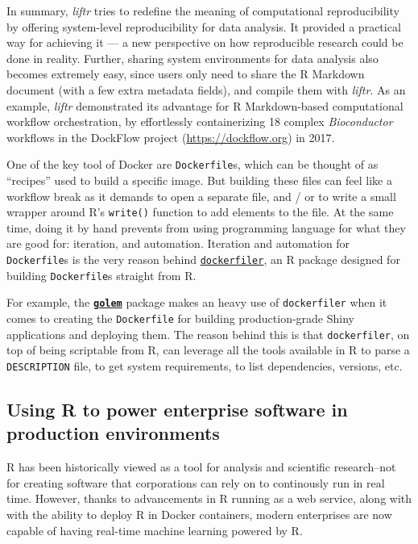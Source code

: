 In summary, \emph{liftr} tries to redefine the meaning of computational
reproducibility by offering system-level reproducibility for data
analysis. It provided a practical way for achieving it --- a new
perspective on how reproducible research could be done in reality.
Further, sharing system environments for data analysis also becomes
extremely easy, since users only need to share the R Markdown document
(with a few extra metadata fields), and compile them with \emph{liftr}.
As an example, \emph{liftr} demonstrated its advantage for R
Markdown-based computational workflow orchestration, by effortlessly
containerizing 18 complex \emph{Bioconductor} workflows in the DockFlow
project (\url{https://dockflow.org}) in 2017.

One of the key tool of Docker are \texttt{Dockerfile}s, which can be
thought of as ``recipes'' used to build a specific image. But building
these files can feel like a workflow break as it demands to open a
separate file, and / or to write a small wrapper around R's
\texttt{write()} function to add elements to the file. At the same time,
doing it by hand prevents from using programming language for what they
are good for: iteration, and automation. Iteration and automation for
\texttt{Dockerfile}s is the very reason behind
\href{https://github.com/ColinFay/dockerfiler}{\texttt{dockerfiler}}, an
R package designed for building \texttt{Dockerfile}s straight from R.

For example, the
\textbf{\href{https://github.com/ThinkR-open/golem}{\texttt{golem}}}
package makes an heavy use of \texttt{dockerfiler} when it comes to
creating the \texttt{Dockerfile} for building production-grade Shiny
applications and deploying them. The reason behind this is that
\texttt{dockerfiler}, on top of being scriptable from R, can leverage
all the tools available in R to parse a \texttt{DESCRIPTION} file, to
get system requirements, to list dependencies, versions, etc.

\hypertarget{using-r-to-power-enterprise-software-in-production-environments}{%
\subsection{Using R to power enterprise software in production
environments}\label{using-r-to-power-enterprise-software-in-production-environments}}

\label{enterprise}

R has been historically viewed as a tool for analysis and scientific
research--not for creating software that corporations can rely on to
continously run in real time. However, thanks to advancements in R
running as a web service, along with with the ability to deploy R in
Docker containers, modern enterprises are now capable of having
real-time machine learning powered by R.

